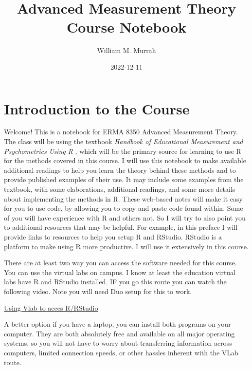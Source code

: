 \documentclass[
]{book}
\title{Advanced Measurement Theory Course Notebook}
\author{William M. Murrah}
\date{2022-12-11}
\begin{document}
\maketitle

{
\setcounter{tocdepth}{1}
\tableofcontents
}
\hypertarget{introduction-to-the-course}{%
\chapter*{Introduction to the Course}\label{introduction-to-the-course}}

Welcome!
This is a notebook for ERMA 8350 Advanced Measurement Theory.
The class will be using the textbook \emph{Handbook of Educational Measurement and Psychometrics Using R} \citep{Desjardins2018Handbookeducationalmeasurement}, which will be the primary source for learning to use R for the methods covered in this course.
I will use this notebook to make available additional readings to help you learn the theory behind these methods and to provide published examples of their use.
It may include some examples from the textbook, with some elaborations, additional readings, and some more details about implementing the methods in R.
These web-based notes will make it easy for you to use code, by allowing you to copy and paste code found within.
Some of you will have experience with R and others not.
So I will try to also point you to additional resources that may be helpful.
For example, in this preface I will provide links to resources to help you setup R and RStudio.
RStudio is a platform to make using R more productive.
I will use it extensively in this course.

There are at least two way you can access the software needed for this course.
You can use the virtual labs on campus.
I know at least the education virtual labs have R and RStudio installed.
IF you go this route you can watch the following video.
Note you will need Duo setup for this to work.

\href{https://nv.instructuremedia.com/fetch/QkFoYkIxc0hhUVNIRGFrSE1Hd3JCeWhUREdFPS0tZjk4ODFlYWEyZWFiNWQwYWYyZDk0YTZjMjljZTJlMjBkNmIwMzE5Yw.mp4}{Using Vlab to acces R/RStudio}

A better option if you have a laptop, you can install both programs on your computer.
They are both absolutely free and available on all major operating systems, so you will not have to worry about transferring information across computers, limited connection speeds, or other hassles inherent with the VLab route.
\end{document}
